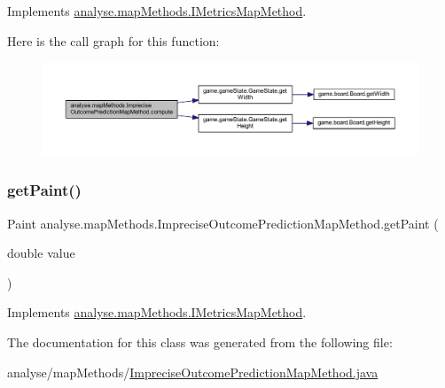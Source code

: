 Implements \mbox{\hyperlink{interfaceanalyse_1_1map_methods_1_1_i_metrics_map_method_aef15b826032a8cc1140563d539dd1319}{analyse.\+map\+Methods.\+I\+Metrics\+Map\+Method}}.

Here is the call graph for this function\+:
\nopagebreak
\begin{figure}[H]
\begin{center}
\leavevmode
\includegraphics[width=350pt]{classanalyse_1_1map_methods_1_1_imprecise_outcome_prediction_map_method_ac10aaad7dc1b63b9cb518b93c5d2b1a3_cgraph}
\end{center}
\end{figure}
\mbox{\label{classanalyse_1_1map_methods_1_1_imprecise_outcome_prediction_map_method_a15f78aca0ee7a41b811c3cc3342beca7}} 
\subsubsection{\texorpdfstring{get\+Paint()}{getPaint()}}
{\footnotesize\ttfamily Paint analyse.\+map\+Methods.\+Imprecise\+Outcome\+Prediction\+Map\+Method.\+get\+Paint (\begin{DoxyParamCaption}\item[{double}]{value }\end{DoxyParamCaption})\hspace{0.3cm}{\ttfamily [inline]}}



Implements \mbox{\hyperlink{interfaceanalyse_1_1map_methods_1_1_i_metrics_map_method_a102909023c32cebe3bc75052f55b24a0}{analyse.\+map\+Methods.\+I\+Metrics\+Map\+Method}}.



The documentation for this class was generated from the following file\+:\begin{DoxyCompactItemize}
\item 
analyse/map\+Methods/\mbox{\hyperlink{_imprecise_outcome_prediction_map_method_8java}{Imprecise\+Outcome\+Prediction\+Map\+Method.\+java}}\end{DoxyCompactItemize}
